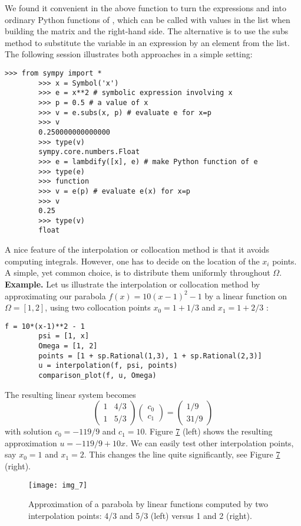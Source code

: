 \documentclass[../main.tex]{subfiles}
\begin{document}
	We found it convenient in the above function to turn the expressions 
	and  into ordinary Python functions of , which can be called with 
	values in the list  when building the matrix and the right-hand side.
	The alternative is to use the subs method to substitute the  variable in an
	expression by an element from the  list. The following session illustrates
	both approaches in a simple setting:\\
	\begin{lstlisting}[numbers=none]
		>>> from sympy import *
		>>> x = Symbol('x')
		>>> e = x**2 # symbolic expression involving x
		>>> p = 0.5 # a value of x
		>>> v = e.subs(x, p) # evaluate e for x=p
		>>> v
		0.250000000000000
		>>> type(v)
		sympy.core.numbers.Float
		>>> e = lambdify([x], e) # make Python function of e
		>>> type(e)
		>>> function
		>>> v = e(p) # evaluate e(x) for x=p
		>>> v
		0.25
		>>> type(v)
		float	
	\end{lstlisting}
	A nice feature of the interpolation or collocation method is that it avoids computing integrals. However, one has to decide on the location of the $x_{i}$ points. A simple, yet common choice, is to distribute them uniformly throughout $\Omega$.
	\bigbreak
	\noindent \textbf{Example.} Let us illustrate the interpolation or collocation method by approximating our parabola $f(x)=10(x-1)^{2}-1$ by a linear function on $\Omega=[1,2]$, using two collocation points $x_{0}=1+1 / 3$ and $x_{1}=1+2 / 3$ :
	\begin{lstlisting}[numbers=none]
		f = 10*(x-1)**2 - 1
		psi = [1, x]
		Omega = [1, 2]
		points = [1 + sp.Rational(1,3), 1 + sp.Rational(2,3)]
		u = interpolation(f, psi, points)
		comparison_plot(f, u, Omega)		
	\end{lstlisting}
	The resulting linear system becomes
	$$
	\left(\begin{array}{ll}
		1 & 4 / 3 \\
		1 & 5 / 3
	\end{array}\right)\left(\begin{array}{l}
		c_{0} \\
		c_{1}
	\end{array}\right)=\left(\begin{array}{l}
		1 / 9 \\
		31 / 9
	\end{array}\right)
	$$
	with solution $c_{0}=-119 / 9$ and $c_{1}=10$. Figure \hyperref[fig:img_7]{7} (left) shows the resulting approximation $u=-119 / 9+10 x$. We can easily test other interpolation points, say $x_{0}=1$ and $x_{1}=2$. This changes the line quite significantly, see Figure \hyperref[fig:img_7]{7} (right).
	\begin{figure}[H]
		\centering
		\texttt{[image: img\_7]}
		\caption{Approximation of a parabola by linear functions computed by two
			interpolation points: 4/3 and 5/3 (left) versus 1 and 2 (right).}
		\label{fig:img_7}
	\end{figure}
\end{document}
